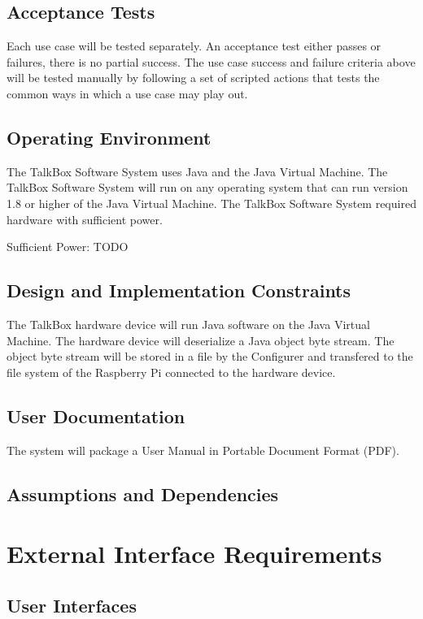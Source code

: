 \section{Acceptance Tests}
Each use case will be tested separately. An acceptance test either passes or failures, there is no partial success. The use case success and failure criteria above will be tested manually by following a set of scripted actions that tests the common ways in which a use case may play out.


\section{Operating Environment}
The TalkBox Software System uses Java and the Java Virtual Machine. The TalkBox Software System will run on any operating system that can run version 1.8 or higher of the Java Virtual Machine. The TalkBox Software System required hardware with sufficient power. 

Sufficient Power: TODO

\section{Design and Implementation Constraints}
The TalkBox hardware device will run Java software on the Java Virtual Machine. The hardware device will deserialize a Java object byte stream. The object byte stream will be stored in a file by the Configurer and transfered to the file system of the Raspberry Pi connected to the hardware device.

\section{User Documentation}
The system will package a User Manual in Portable Document Format (PDF).
\section{Assumptions and Dependencies}

\newpage




\chapter{External Interface Requirements}
\label{External Interface Requirements}

\section{User Interfaces}
